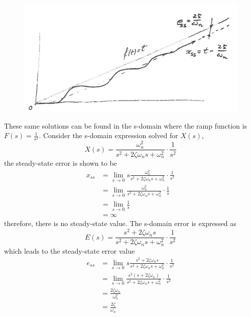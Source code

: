 \documentclass[12pt,letter]{article}
\begin{document}
\begin{figure}[H]
	\centering
	\includegraphics[width=5.5in]{../figures/ramp_response_2nd_order_with_steady_state_error_annotated}
\end{figure}

These same solutions can be found in the s-domain where the ramp function is $F(s)=\frac{1}{s^2}$. Consider the s-domain expression solved for $X(s)$, 
\begin{equation}
X(s) = \frac{\omega_n^2}{s^2 + 2 \zeta \omega_n s + \omega_n^2}  \cdot \frac{1}{s^2} 
\end{equation}
the steady-state error is shown to be
\begin{align}
x_{ss} &= \lim\limits_{s \rightarrow 0} s \frac{\omega_n^2}{s^2 + 2 \zeta \omega_n s + \omega_n^2} \cdot \frac{1}{s^2}  \\
&= \lim\limits_{s \rightarrow 0} \frac{\omega_n^2}{s^2 + 2 \zeta \omega_n s + \omega_n^2} \cdot \frac{1}{s}  \nonumber \\
&= \lim\limits_{s \rightarrow 0}\frac{1}{s}  \nonumber \\
&= \infty  \nonumber
\end{align}
therefore, there is no steady-state value. The s-domain error is expressed as
\begin{equation}
E(s) = \frac{s^2 + 2 \zeta \omega_n s}{s^2 + 2 \zeta \omega_n s + \omega_n^2} \cdot \frac{1}{s^2}
\end{equation}
which leads to the steady-state error value
\begin{align}
e_{ss} &= \lim\limits_{s \rightarrow 0}  s \frac{s^2 + 2 \zeta \omega_n s}{s^2 + 2 \zeta \omega_n s + \omega_n^2} \cdot \frac{1}{s^2} \\
&= \lim\limits_{s \rightarrow 0}   \frac{s^2( s + 2 \zeta \omega_n)}{s^2 + 2 \zeta \omega_n s + \omega_n^2} \cdot \frac{1}{s^2} \nonumber  \\ 
&= \frac{2 \zeta \omega_n}{\omega_n^2}   \nonumber \\
&= \frac{2 \zeta }{\omega_n}   \nonumber
\end{align}
\end{document}
